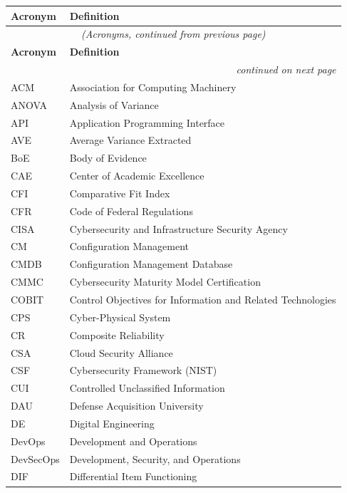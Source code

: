 \begin{singlespace}
\begin{longtable}{p{} p{}}
\toprule
\textbf{Acronym} & \textbf{Definition} \\
\midrule
\endfirsthead
\multicolumn{2}{c}{\textit{(Acronyms, continued from previous page)}} \\
\toprule
\textbf{Acronym} & \textbf{Definition} \\
\midrule
\endhead
\midrule
\multicolumn{2}{r}{\textit{continued on next page}} \\
\endfoot
\bottomrule
\endlastfoot
ACM       & Association for Computing Machinery \\
ANOVA     & Analysis of Variance \\
API       & Application Programming Interface \\
AVE       & Average Variance Extracted \\
BoE       & Body of Evidence \\
CAE       & Center of Academic Excellence \\
CFI       & Comparative Fit Index \\
CFR       & Code of Federal Regulations \\
CISA      & Cybersecurity and Infrastructure Security Agency \\
CM        & Configuration Management \\
CMDB      & Configuration Management Database \\
CMMC      & Cybersecurity Maturity Model Certification \\
COBIT     & Control Objectives for Information and Related Technologies \\
CPS       & Cyber-Physical System \\
CR        & Composite Reliability \\
CSA       & Cloud Security Alliance \\
CSF       & Cybersecurity Framework (NIST) \\
CUI       & Controlled Unclassified Information \\
DAU       & Defense Acquisition University \\
DE        & Digital Engineering \\
DevOps    & Development and Operations \\
DevSecOps & Development, Security, and Operations \\
DIF       & Differential Item Functioning \\

\end{longtable}
\end{singlespace}
